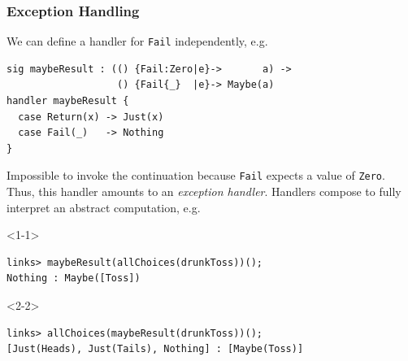 \documentclass[10pt,compress]{beamer}
\begin{document}
\begin{frame}[fragile]
\frametitle{Exception Handling}
%
We can define a handler for \lstinline$Fail$ independently, e.g.
%
\begin{lstlisting}
sig maybeResult : (() {Fail:Zero|e}->       a) ->
                   () {Fail{_}  |e}-> Maybe(a)
handler maybeResult {
  case Return(x) -> Just(x)
  case Fail(_)   -> Nothing
}
\end{lstlisting}
%
Impossible to invoke the continuation because \lstinline$Fail$ expects
a value of \lstinline$Zero$. Thus, this handler amounts to an \emph{exception handler}.
\vfill
Handlers compose to fully interpret an abstract computation, e.g.
\begin{onlyenv}<1-1>
\begin{lstlisting}[style=terminal]
links> maybeResult(allChoices(drunkToss))();
Nothing : Maybe([Toss])
\end{lstlisting}
\end{onlyenv}
%
\begin{onlyenv}<2-2>
\begin{lstlisting}[style=terminal]
links> allChoices(maybeResult(drunkToss))();
[Just(Heads), Just(Tails), Nothing] : [Maybe(Toss)]
\end{lstlisting}
\end{onlyenv}
\end{frame}
\end{document}
